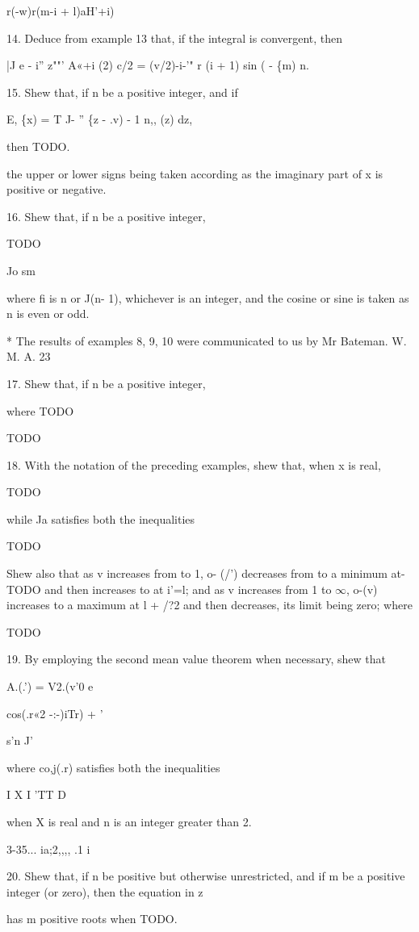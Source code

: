 r(-w)r(m-i + l)aH'+i)

14. Deduce from example 13 that, if the integral is convergent, then

|J e - i'' z""' A«+i (2) c/2 = (v/2)-i-'" r (i + 1) sin ( - \{m) n.


15. Shew that, if n be a positive integer, and if

E, \{x) = T J- '' \{z - .v) - 1 n,, (z) dz,

then TODO.

the upper or lower signs being taken according as the imaginary part
of x is positive or negative. 

16. Shew that, if n be a positive integer,

TODO

Jo sm

where fi is n or J(n- 1), whichever is an integer, and the cosine or
sine is taken as n is even or odd. 

* The results of examples 8, 9, 10 were communicated to us by Mr
Bateman. W. M. A. 23

%
%

17. Shew that, if n be a positive integer,

where TODO

TODO 

18. With the notation of the preceding examples, shew that, when x is
real,

TODO

while Ja satisfies both the inequalities

TODO

Shew also that as v increases from to 1, o- (/') decreases from to a
minimum at- TODO and then increases to at i'=l; and as v increases
from 1 to $\infty$, o-(v) increases to a maximum at l + /?2 and then
decreases, its limit being zero; where

TODO 

19. By employing the second mean value theorem when necessary, shew
that

A.(.') = V2.(v'0 e

cos(.r«2 -:-)iTr) + '

s'n J'

where co,j(.r) satisfies both the inequalities

I X I 'TT D

when X is real and n is an integer greater than 2. 

3-35... ia;2,,,, .1 i

20. Shew that, if n be positive but otherwise unrestricted, and if m
be a positive integer (or zero), then the equation in z

has m positive roots when TODO. 